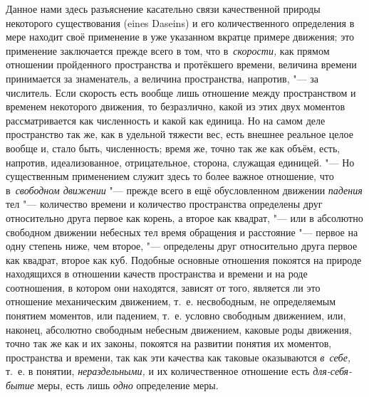 Данное нами здесь разъяснение касательно связи качественной природы некоторого
существования (eines Daseins) и его количественного определения в мере находит
своё применение в уже указанном вкратце примере движения; это применение
заключается прежде всего в том, что в~{\em скорости,} как прямом отношении
пройденного пространства и протёкшего времени, величина времени принимается за
знаменатель, а величина пространства, напротив, "--- за числитель. Если
скорость есть вообще лишь отношение между пространством и временем некоторого
движения, то безразлично, какой из этих двух моментов рассматривается как
численность и какой как единица. Но на самом деле пространство так же, как в
удельной тяжести вес, есть внешнее реальное целое вообще и, стало быть,
численность; время же, точно так же как объём, есть, напротив, идеализованное,
отрицательное, сторона, служащая единицей. "--- Но существенным применением
служит здесь то более важное отношение, что в~{\em свободном движении} "---
прежде всего в ещё обусловленном движении {\em падения} тел "--- количество
времени и количество пространства определены друг относительно друга первое как
корень, а второе как квадрат, "--- или в абсолютно свободном движении небесных
тел время обращения и расстояние "--- первое на одну степень ниже, чем второе,
"--- определены друг относительно друга первое как квадрат, второе как куб.
Подобные основные отношения покоятся на природе находящихся в отношении качеств
пространства и времени и на роде соотношения, в котором они находятся, зависят
от того, является ли это отношение механическим движением, т.~е. несвободным,
не определяемым понятием моментов, или падением, т.~е. условно свободным
движением, или, наконец, абсолютно свободным небесным движением, каковые роды
движения, точно так же как и их законы, покоятся на развитии понятия их
моментов, пространства и времени, так как эти качества как таковые оказываются
{\em в~себе,} т.~е. в понятии, {\em нераздельными,} и их количественное
отношение есть {\em для-себя-бытие} меры, есть лишь {\em одно} определение
меры.

